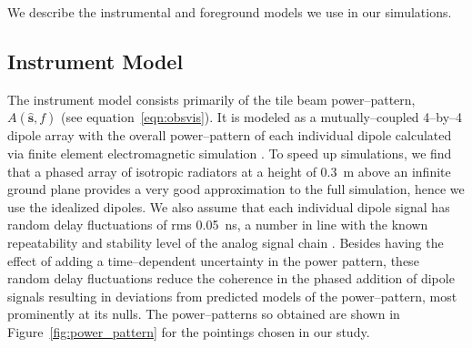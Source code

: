 \documentclass[preprint2,iop,numberedappendix]{emulateapj}
\begin{document}
We describe the instrumental and foreground models we use in our simulations. 

\subsection{Instrument Model}\label{sec:instrument_model}

The instrument model consists primarily of the tile beam power--pattern, $A(\hat{\boldsymbol{s}},f)$ (see equation~\ref{eqn:obsvis}). It is modeled as a mutually--coupled 4--by--4 dipole array with the overall power--pattern of each individual dipole calculated via finite element electromagnetic simulation \citep{sut14_arXiv}. To speed up simulations, we find that a phased array of isotropic radiators at a height of 0.3~m above an infinite ground plane provides a very good approximation to the full simulation, hence we use the idealized dipoles. We also assume that each individual dipole signal has random delay fluctuations of rms 0.05~ns, a number in line with the known repeatability and stability level of the analog signal chain \citep{bow07b}. Besides having the effect of adding a time--dependent uncertainty in the power pattern, these random delay fluctuations reduce the coherence in the phased addition of dipole signals resulting in deviations from predicted models of the power--pattern, most prominently at its nulls. The power--patterns so obtained are shown in Figure~\ref{fig:power_pattern} for the pointings chosen in our study.
\end{document}
